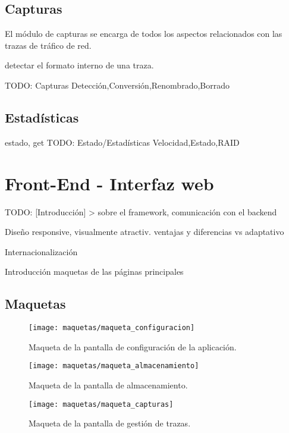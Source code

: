 \subsection{Capturas\label{ssec:dis:capturas}}

El módulo de capturas se encarga de todos los aspectos relacionados con las \glspl{traza} de tráfico de red.


detectar el formato interno de una \gls{traza}.

TODO: Capturas
  {Detección,Conversión,Renombrado,Borrado}


\subsection{Estadísticas\label{ssec:dis:estadisticas}}

estado, get
TODO: Estado/Estadísticas
  {Velocidad,Estado,RAID}


\section{Front-End - Interfaz web\label{sec:dis:interfaz_web}}

TODO: [Introducción] > sobre el framework, comunicación con el backend

Diseño responsive, visualmente atractiv. ventajas y diferencias vs adaptativo

Internacionalización

Introducción maquetas de las páginas principales

\subsection{Maquetas\label{ssec:dis:maquetas}}

\begin{figure}[!htp]
  \centering
  \texttt{[image: maquetas/maqueta\_configuracion]}
  \caption{Maqueta de la pantalla de configuración de la aplicación.}
  \label{fig:maqueta:configuracion}
\end{figure}

\begin{figure}[!htp]
  \centering
  \texttt{[image: maquetas/maqueta\_almacenamiento]}
  \caption{Maqueta de la pantalla de almacenamiento.}
  \label{fig:maqueta:almacenamiento}
\end{figure}

\begin{figure}[!htp]
  \centering
  \texttt{[image: maquetas/maqueta\_capturas]}
  \caption{Maqueta de la pantalla de gestión de \glspl{traza}.}
  \label{fig:maqueta:capturas}
\end{figure}

